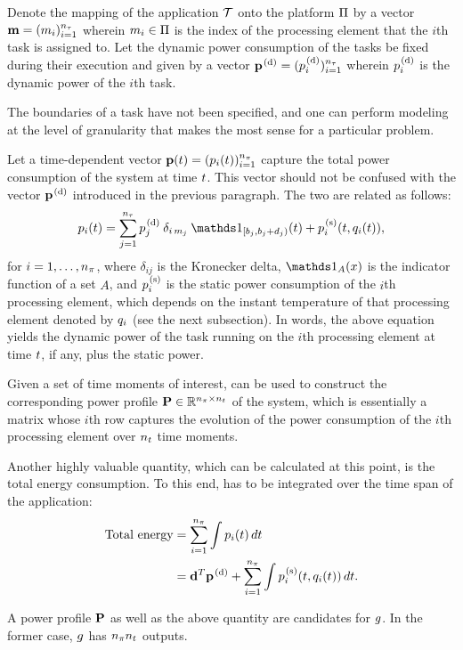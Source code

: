 Denote the mapping of the application $\mathcal{T}$ onto the platform $\Pi$ by a
vector $\mathbf{m} = (m_i)_{i = 1}^{{n_\tau}}$ wherein $m_i \in \Pi$ is the index of
the processing element that the $i$th task is assigned to. Let the dynamic power
consumption of the tasks be fixed during their execution and given by a vector
$\mathbf{p}^{\text{\kern0.1em(d)}} = (p^{\text{\kern0.1em(d)}}_i)_{i = 1}^{{n_\tau}}$ wherein $p^{\text{\kern0.1em(d)}}_i$ is the
dynamic power of the $i$th task.

\begin{remark}
The boundaries of a task have not been specified, and one can perform modeling
at the level of granularity that makes the most sense for a particular problem.
\end{remark}

Let a time-dependent vector $\mathbf{p}(t) = (p_i(t))_{i = 1}^{{n_\pi}}$ capture the
total power consumption of the system at time $t$. This vector should not be
confused with the vector $\mathbf{p}^{\text{\kern0.1em(d)}}$ introduced in the previous paragraph.
The two are related as follows:
\begin{equation} \elab{power}
  \p_i(\t) = \sum_{j = 1}^\nt \p^\dynamic_j \: \delta_{i\,m_j} \: \one_{[\b_j, \b_j + \d_j)}(\t) + \p^\static_i(\t, \q_i(\t)),
\end{equation}
for $i = 1, \dots, {n_\pi}$, where $\delta_{ij}$ is the Kronecker delta, $\one_A(x)$
is the indicator function of a set $A$, and $p^{\text{\kern0.1em(s)}}_i$ is the static power
consumption of the $i$th processing element, which depends \cite{liu2007} on the
instant temperature of that processing element denoted by $q_i$ (see the next
subsection). In words, the above equation yields the dynamic power of the task
running on the $i$th processing element at time $t$, if any, plus the static
power.

Given a set of time moments of interest,  can be used to construct
the corresponding power profile $\mathbf{P} \in \mathbb{R}^{{n_\pi} \times {n_t}}$ of the system,
which is essentially a matrix whose $i$th row captures the evolution of the
power consumption of the $i$th processing element over ${n_t}$ time moments.

Another highly valuable quantity, which can be calculated at this point, is the
total energy consumption. To this end,  has to be integrated over
the time span of the application:
\begin{align}
  \text{Total energy} &= \sum_{i = 1}^\np \int \p_i(\t) \, d\t \elab{total-energy} \\
                      &= \vd^T \vp^\dynamic + \sum_{i = 1}^\np \int \p^\static_i(\t, \q_i(\t)) \, d\t. \nonumber
\end{align}

A power profile $\mathbf{P}$ as well as the above quantity are candidates for $g$. In
the former case, $g$ has ${n_\pi} {n_t}$ outputs.

